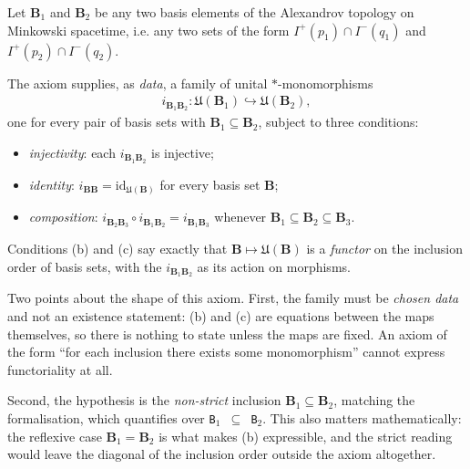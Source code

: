 \begin{definition}
    \label{def:isotony}
    \leanok
    Let $\mathbf{B}_1$ and $\mathbf{B}_2$ be any two basis elements of the Alexandrov topology on Minkowski spacetime, i.e. any two sets of the form $I^+(p_1) \cap I^-(q_1)$ and $I^+(p_2) \cap I^-(q_2)$.

    The axiom supplies, as \emph{data}, a family of unital $*$-monomorphisms
    \begin{align}
        i_{\mathbf{B}_1\mathbf{B}_2} : \mathfrak{U}(\mathbf{B}_1) \hookrightarrow \mathfrak{U}(\mathbf{B}_2),
    \end{align}
    one for every pair of basis sets with $\mathbf{B}_1 \subseteq \mathbf{B}_2$, subject to three conditions:
    \begin{itemize}
        \item[(a)] \emph{injectivity}: each $i_{\mathbf{B}_1\mathbf{B}_2}$ is injective;
        \item[(b)] \emph{identity}: $i_{\mathbf{B}\mathbf{B}} = \mathrm{id}_{\mathfrak{U}(\mathbf{B})}$ for every basis set $\mathbf{B}$;
        \item[(c)] \emph{composition}: $i_{\mathbf{B}_2\mathbf{B}_3} \circ i_{\mathbf{B}_1\mathbf{B}_2} = i_{\mathbf{B}_1\mathbf{B}_3}$ whenever $\mathbf{B}_1 \subseteq \mathbf{B}_2 \subseteq \mathbf{B}_3$.
    \end{itemize}
    Conditions (b) and (c) say exactly that $\mathbf{B} \mapsto \mathfrak{U}(\mathbf{B})$ is a \emph{functor} on the inclusion order of basis sets, with the $i_{\mathbf{B}_1\mathbf{B}_2}$ as its action on morphisms.

    Two points about the shape of this axiom. First, the family must be \emph{chosen data} and not an existence statement: (b) and (c) are equations between the maps themselves, so there is nothing to state unless the maps are fixed. An axiom of the form ``for each inclusion there exists some monomorphism'' cannot express functoriality at all.

    Second, the hypothesis is the \emph{non-strict} inclusion $\mathbf{B}_1 \subseteq \mathbf{B}_2$, matching the formalisation, which quantifies over \texttt{B\ensuremath{_1} \ensuremath{\subseteq} B\ensuremath{_2}}. This also matters mathematically: the reflexive case $\mathbf{B}_1 = \mathbf{B}_2$ is what makes (b) expressible, and the strict reading would leave the diagonal of the inclusion order outside the axiom altogether.


\end{definition}
